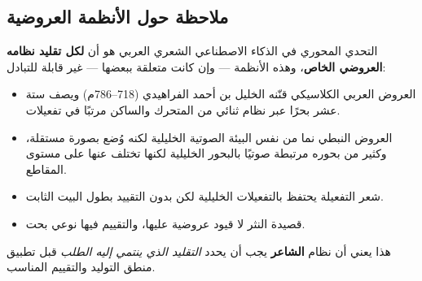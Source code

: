 \begin{otherlanguage}{arabic}
\section*{ملاحظة حول الأنظمة العروضية}

التحدي المحوري في الذكاء الاصطناعي الشعري العربي هو أن \textbf{لكل تقليد نظامه العروضي الخاص}، وهذه الأنظمة — وإن كانت متعلقة ببعضها — غير قابلة للتبادل:

\begin{itemize}
  \item العروض العربي الكلاسيكي قنّنه الخليل بن أحمد الفراهيدي (718–786م) ويصف ستة عشر بحرًا عبر نظام ثنائي من المتحرك والساكن مرتبًا في تفعيلات.
  \item العروض النبطي نما من نفس البيئة الصوتية الخليلية لكنه وُضع بصورة مستقلة، وكثير من بحوره مرتبطة صوتيًا بالبحور الخليلية لكنها تختلف عنها على مستوى المقاطع.
  \item شعر التفعيلة يحتفظ بالتفعيلات الخليلية لكن بدون التقييد بطول البيت الثابت.
  \item قصيدة النثر لا قيود عروضية عليها، والتقييم فيها نوعي بحت.
\end{itemize}

هذا يعني أن نظام \textbf{الشاعر} يجب أن يحدد \textit{التقليد الذي ينتمي إليه الطلب} قبل تطبيق منطق التوليد والتقييم المناسب.

\end{otherlanguage}

